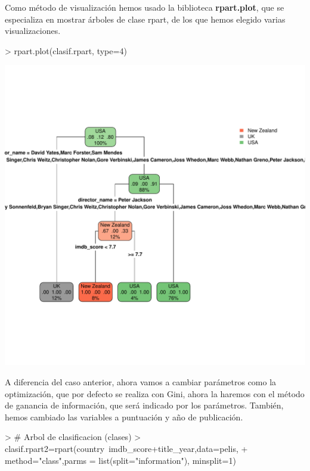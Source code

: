 \documentclass[a4paper]{article}
\begin{document}
Como método de visualización hemos usado la biblioteca \textbf{rpart.plot}, que se especializa en mostrar árboles de clase rpart, de los que hemos elegido varias visualizaciones.

\begin{Schunk}
\begin{Sinput}
> rpart.plot(clasif.rpart, type=4)
\end{Sinput}
\end{Schunk}
\includegraphics{practica-3-rpart1}
 
 A diferencia del caso anterior, ahora vamos a cambiar parámetros como la optimización, que por defecto se realiza con Gini, ahora la haremos con el método de ganancia de información, que será indicado por los parámetros. También, hemos cambiado las variables a puntuación y año de publicación.
 
\begin{Schunk}
\begin{Sinput}
> # Arbol de clasificacion (clases)
> clasif.rpart2=rpart(country~imdb_score+title_year,data=pelis,
+     method="class",parms = list(split="information"), minsplit=1)
\end{Sinput}
\end{Schunk}
\end{document}
